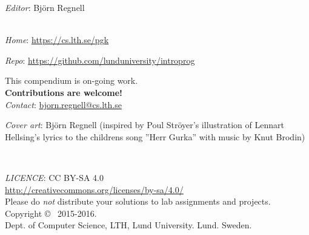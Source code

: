 
\clearpage\null\thispagestyle{empty}
\vfill

{
\setlength{\parindent}{0pt}
\emph{Editor}: Björn Regnell \\ 


\\ \newline

\emph{Home}: \url{https://cs.lth.se/pgk} \newline

\emph{Repo}: \url{https://github.com/lunduniversity/introprog} \\ \newline

This compendium is on-going work. \\ \textbf{Contributions are welcome!} \\ 
\emph{Contact}: \url{bjorn.regnell@cs.lth.se}
\\ \newline

\emph{Cover art}: Björn Regnell (inspired by Poul Ströyer's illustration of Lennart Hellsing's lyrics to  the childrens song ''Herr Gurka'' with music by Knut Brodin)\\ \newline

~\\ \newline

\emph{LICENCE}: CC BY-SA 4.0 \\
\url{http://creativecommons.org/licenses/by-sa/4.0/} \\
Please do \emph{not} distribute your solutions to lab assignments and projects. 
\\ \newline
Copyright \copyright~ 2015-2016. \\
Dept. of Computer Science, LTH, Lund University. Lund. Sweden.\\
}